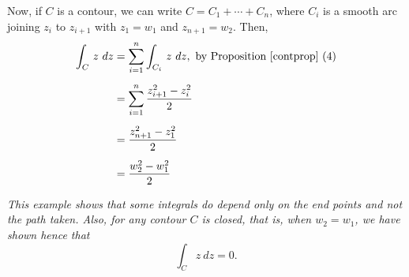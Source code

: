 \begin{example}
\begin{itemize}[itemsep=1.5em]

\medskip

Now, if $C$ is a contour, we can write $C = C_1 + \cdots + C_n$, where $C_i$ is a smooth arc joining $z_i$ to $z_{i+ 1}$ with $z_1 = w_1$ and $z_{n+1} = w_2$. Then,
\begin{align*}
\int_C\,z\ dz &= \sum_{i=1}^n\int_{C_i}\,z\ dz,\ \text{by Proposition \ref{contprop} (4)}\\[0.5em]
 &= \sum_{i=1}^n \frac{z_{i+1}^2 - z_i^2}{2}\\[0.5em]
 &= \frac{z_{n+1}^2 - z_1^2}{2}\\[0.5em]
 &= \frac{w_2^2 - w_1^2}{2}
\end{align*}

\emph{This example shows that some integrals do depend only on the end points and not the path taken. Also, for any contour $C$ is closed, that is, when $w_2 = w_1$, we have shown hence that
\[\int_C z\ dz = 0.\]}


\end{itemize}
\end{example}
